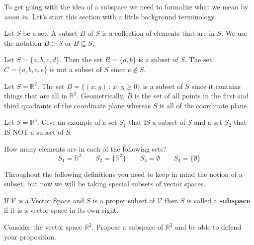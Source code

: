 To get going with the idea of a subspace we need to formalize what we mean by {\it zoom
in}.  Let's start this section with a little background terminology.
\begin{definition}[Subset]
    Let $S$ be a set.  A subset $B$ of $S$ is a collection of elements that are in $S$.
    We use the notation $B \subset S$ or $B \subseteq S$.
\end{definition}
\begin{example}
    Let $S = \{ a,b,c,d\}$.  Then the set $B = \{a,b\}$ is a subset of $S$.  The set $C =
    \{ a,b,c,e\}$ is not a subset of $S$ since $e \not\in S$.  
\end{example}

\begin{example}
    Let $S = \mathbb{R}^2$.  The set $B = \{ (x,y) \, : \, x \cdot y \ge 0 \}$ is a subset
    of $S$ since it contains things that are all in $\mathbb{R}^2$.  Geometrically, $B$ is
    the set of all points in the first and third quadrants of the coordinate plane whereas
    $S$ is all of the coordinate plane.
\end{example}

\begin{problem}
    Let $S = \mathbb{R}^3$.  Give an example of a set $S_1$ that IS a subset of $S$ and a
    set $S_2$ that IS NOT a subset of $S$.
\end{problem}

\begin{problem}
    How many elements are in each of the following sets?
    \[ S_1 = \mathbb{R}^2 \qquad S_2 = \{ \mathbb{R}^2 \} \qquad S_3 = \emptyset \qquad
    S_4 = \{ \emptyset \} \]
\end{problem}

Throughout the following definitions you need to keep in mind the notion of a subset, but
now we will be taking special subsets of vector spaces.
\begin{definition}[Subspace]
    If $\mathcal{V}$ is a Vector Space and $S$ is a proper subset of $\mathcal{V}$
    then $S$ is called a {\bf subspace} if it is a vector space in its own right.
\end{definition}

\begin{problem}
    Consider the vector space $\mathbb{R}^2$.  Propose a subspace of $\mathbb{R}^2$ and be
    able to defend your proposition.
\end{problem}


